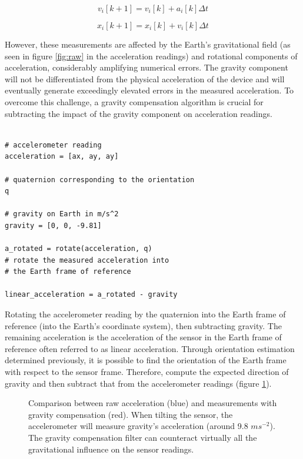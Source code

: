\begin{equation}
    v_i[k+1]= v_i[k]+a_i[k]\Delta t
\end{equation}

\begin{equation}
    x_i[k+1]= x_i[k]+v_i[k]\Delta t
\end{equation}

However, these measurements are affected by the Earth's gravitational field (as seen in figure \ref{fig:raw} in the acceleration readings) and rotational components of acceleration, considerably amplifying numerical errors. The gravity component will not be differentiated from the physical acceleration of the device and will eventually generate exceedingly elevated errors in the measured acceleration. To overcome this challenge, a gravity compensation algorithm is crucial for subtracting the impact of the gravity component on acceleration readings.

\lstset{language=Python}
\begin{lstlisting}[frame=single]  % Start your code-block
    
# accelerometer reading
acceleration = [ax, ay, ay]  

# quaternion corresponding to the orientation
q                            

# gravity on Earth in m/s^2
gravity = [0, 0, -9.81]      

a_rotated = rotate(acceleration, q) 
# rotate the measured acceleration into
# the Earth frame of reference

linear_acceleration = a_rotated - gravity

\end{lstlisting}

Rotating the accelerometer reading by the quaternion into the Earth frame of reference (into the Earth's coordinate system), then subtracting gravity. The remaining acceleration is the acceleration of the sensor in the Earth frame of reference often referred to as linear acceleration. Through orientation estimation determined previously, it is possible to find the orientation of the Earth frame with respect to the sensor frame. Therefore, compute the expected direction of gravity and then subtract that from the accelerometer readings (figure \ref{fig:gavity_compensation}).

\begin{figure}[!h]
    \centering
    \resizebox{0.8\linewidth}{!}{}
    \caption{Comparison between raw acceleration (blue) and measurements with gravity compensation (red). When tilting the sensor, the accelerometer will measure gravity's acceleration (around 9.8 $ms^{-2}$). The gravity compensation filter can counteract virtually all the gravitational influence on the sensor readings.}
    \label{fig:gavity_compensation}
\end{figure}

